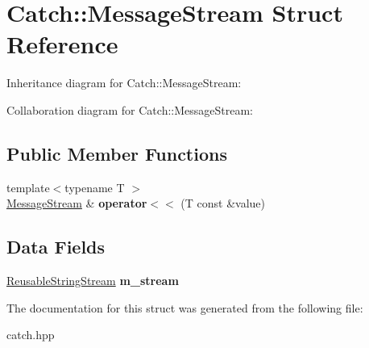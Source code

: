 \hypertarget{structCatch_1_1MessageStream}{}\section{Catch\+:\+:Message\+Stream Struct Reference}
\label{structCatch_1_1MessageStream}


Inheritance diagram for Catch\+:\+:Message\+Stream\+:


Collaboration diagram for Catch\+:\+:Message\+Stream\+:
\subsection*{Public Member Functions}
\begin{DoxyCompactItemize}
\item 
\mbox{\label{structCatch_1_1MessageStream_a554c4aff5925a077e9fe9d858217428d}} 
{\footnotesize template$<$typename T $>$ }\\\hyperlink{structCatch_1_1MessageStream}{Message\+Stream} \& {\bfseries operator$<$$<$} (T const \&value)
\end{DoxyCompactItemize}
\subsection*{Data Fields}
\begin{DoxyCompactItemize}
\item 
\mbox{\label{structCatch_1_1MessageStream_a9202520faed8882ef469db9f353ec578}} 
\hyperlink{classCatch_1_1ReusableStringStream}{Reusable\+String\+Stream} {\bfseries m\+\_\+stream}
\end{DoxyCompactItemize}


The documentation for this struct was generated from the following file\+:\begin{DoxyCompactItemize}
\item 
catch.\+hpp\end{DoxyCompactItemize}
